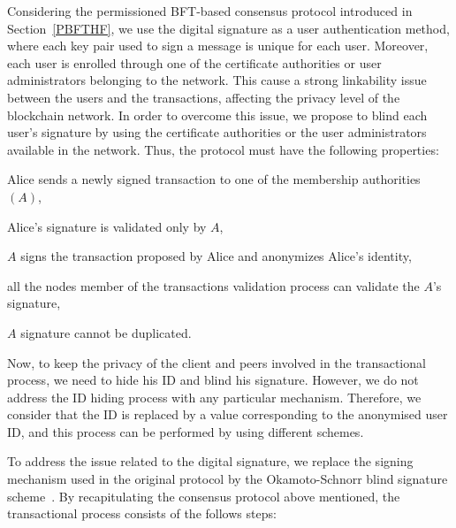 \documentclass[conference]{llncs}
\begin{document}
Considering the permissioned BFT-based consensus protocol introduced in Section~\ref{PBFTHF}, we use the digital signature as a user authentication method, where each key pair used to sign a message is unique for each user. Moreover, each user is enrolled through one of the certificate authorities or user administrators belonging to the network. This cause a strong linkability issue between the users and the transactions, affecting the privacy level of the blockchain network. In order to overcome this issue, we propose to blind each user's signature by using the certificate authorities or the user administrators available in the network. Thus, the protocol must have the following properties:  

\begin{compactitem}
    \item Alice sends a newly signed transaction to one of the membership authorities $(A)$,
    \item Alice’s signature is validated only by $A$,
    \item $A$ signs the transaction proposed by Alice and anonymizes Alice’s identity,
    \item all the nodes member of the transactions validation process can validate the $A$'s signature,
    \item $A$ signature cannot be duplicated.
\end{compactitem}

Now, to keep the privacy of the client and peers involved in the transactional process, we need to hide his ID and blind his signature. However, we do not address the ID hiding process with any particular mechanism. Therefore, we consider that the ID is replaced by a value corresponding to the anonymised user ID, and this process can be performed by using different schemes.

To address the issue related to the digital signature, we replace the signing mechanism used in the original protocol by the Okamoto-Schnorr blind signature scheme~\cite{okamoto1992provably}. By recapitulating the consensus protocol above mentioned, the transactional process consists of the follows steps:
\end{document}
